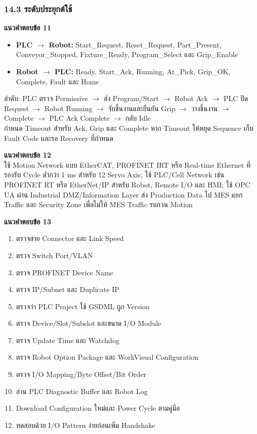 \subsubsection{14.3 ระดับประยุกต์ใช้}

\textbf{แนวคำตอบข้อ 11}

\begin{itemize}
    \item \textbf{PLC \(\to\) Robot:} Start\_Request, Reset\_Request, Part\_Present, Conveyor\_Stopped, Fixture\_Ready, Program\_Select และ Grip\_Enable
    \item \textbf{Robot \(\to\) PLC:} Ready, Start\_Ack, Running, At\_Pick, Grip\_OK, Complete, Fault และ Home
\end{itemize}

ลำดับ: PLC ตรวจ Permissive \(\to\) ส่ง Program/Start \(\to\) Robot Ack \(\to\) PLC ปิด Request \(\to\) Robot Running \(\to\) จับชิ้นงานและยืนยัน Grip \(\to\) วางชิ้นงาน \(\to\) Complete \(\to\) PLC Ack Complete \(\to\) กลับ Idle \\
กำหนด Timeout สำหรับ Ack, Grip และ Complete หาก Timeout ให้หยุด Sequence เก็บ Fault Code และรอ Recovery ที่กำหนด

\textbf{แนวคำตอบข้อ 12} \\
ใช้ Motion Network แบบ EtherCAT, PROFINET IRT หรือ Real-time Ethernet ที่รองรับ Cycle ต่ำกว่า 1 ms สำหรับ 12 Servo Axis; ใช้ PLC/Cell Network เช่น PROFINET RT หรือ EtherNet/IP สำหรับ Robot, Remote I/O และ HMI; ใช้ OPC UA ผ่าน Industrial DMZ/Information Layer ส่ง Production Data ไป MES แยก Traffic และ Security Zone เพื่อไม่ให้ MES Traffic รบกวน Motion

\textbf{แนวคำตอบข้อ 13}

\begin{enumerate}
    \item ตรวจสาย Connector และ Link Speed
    \item ตรวจ Switch Port/VLAN
    \item ตรวจ PROFINET Device Name
    \item ตรวจ IP/Subnet และ Duplicate IP
    \item ตรวจว่า PLC Project ใช้ GSDML ถูก Version
    \item ตรวจ Device/Slot/Subslot และขนาด I/O Module
    \item ตรวจ Update Time และ Watchdog
    \item ตรวจ Robot Option Package และ WorkVisual Configuration
    \item ตรวจ I/O Mapping/Byte Offset/Bit Order
    \item อ่าน PLC Diagnostic Buffer และ Robot Log
    \item Download Configuration ใหม่และ Power Cycle ตามคู่มือ
    \item ทดสอบด้วย I/O Pattern ง่ายก่อนเพิ่ม Handshake
\end{enumerate}



